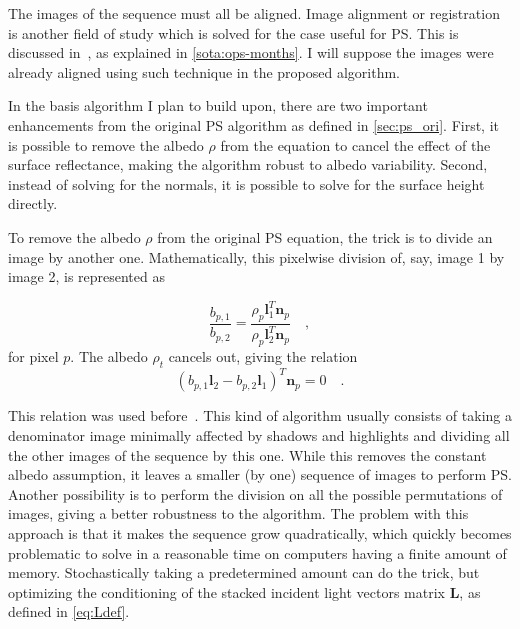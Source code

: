 The images of the sequence must all be aligned. Image alignment or registration is another field of study which is solved for the case useful for PS. This is discussed in~\cite{ackermann-cvpr-12}, as explained in \ref{sota:ops-months}. I will suppose the images were already aligned using such technique in the proposed algorithm.

In the basis algorithm I plan to build upon, there are two important enhancements from the original PS algorithm as defined in \ref{sec:ps_ori}. First, it is possible to remove the albedo $\rho$ from the equation to cancel the effect of the surface reflectance, making the algorithm robust to albedo variability. Second, instead of solving for the normals, it is possible to solve for the surface height directly. 

To remove the albedo $\rho$ from the original PS equation, the trick is to divide an image by another one. Mathematically, this pixelwise division of, say, image 1 by image 2, is represented as

\begin{equation}
\frac{b_{p,1}}{b_{p,2}} = \frac{\rho_p \mathbf{l}_1^T \mathbf{n}_p}{\rho_p \mathbf{l}_2^T \mathbf{n}_p} \quad,
\end{equation}
for pixel $p$. The albedo $\rho_t$ cancels out, giving the relation
\begin{equation}
\label{eq:ratio_images}
\left( b_{p,1} \mathbf{l}_2 - b_{p,2} \mathbf{l}_1 \right)^T \mathbf{n}_p = 0  \quad.
\end{equation}

This relation was used before~\cite{yu-iccp-13,wu-pami-06}. This kind of algorithm usually consists of taking a denominator image minimally affected by shadows and highlights and dividing all the other images of the sequence by this one. While this removes the constant albedo assumption, it leaves a smaller (by one) sequence of images to perform PS. Another possibility is to perform the division on all the possible permutations of images, giving a better robustness to the algorithm. The problem with this approach is that it makes the sequence grow quadratically, which quickly becomes problematic to solve in a reasonable time on computers having a finite amount of memory. Stochastically taking a predetermined amount can do the trick, but optimizing the conditioning of the stacked incident light vectors matrix $\mathbf{L}$, as defined in \eqref{eq:Ldef}.
 
